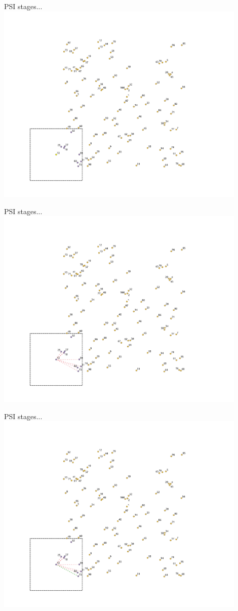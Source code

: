 \documentclass{beamer}
\begin{document}
\begin{frame}{PSI stages...}
    \centering
    \includegraphics[trim={0cm 0cm 0cm 1.5cm}, clip, width=0.9\textwidth]{figures/psi2/p03}
\end{frame}
\begin{frame}{PSI stages...}
    \centering
    \includegraphics[trim={0cm 0cm 0cm 1.5cm}, clip, width=0.9\textwidth]{figures/psi2/p04}
\end{frame}
\begin{frame}{PSI stages...}
    \centering
    \includegraphics[trim={0cm 0cm 0cm 1.5cm}, clip, width=0.9\textwidth]{figures/psi2/p05}
\end{frame}
\end{document}
